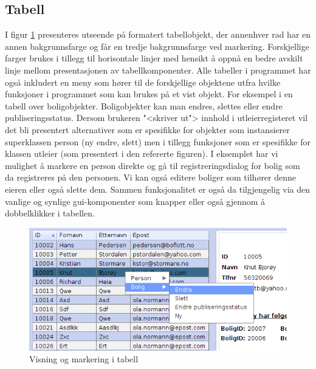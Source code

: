 \subsection{Tabell}
I figur \ref{fig:tabell} presenteres utseende på formatert tabellobjekt, der annenhver rad har en annen bakgrunnsfarge og får en tredje bakgrunnsfarge ved markering. Forskjellige farger brukes i tillegg til horisontale linjer med hensikt å oppnå en bedre avskilt linje mellom presentasjonen av tabellkomponenter. Alle tabeller i programmet har også inkludert en meny som hører til de forskjellige objektene utfra hvilke funksjoner i programmet som kan brukes på et vist objekt. For eksempel i en tabell over boligobjekter. Boligobjekter kan man endres, slettes eller endre publiseringsstatus. Dersom brukeren "<skriver ut"> innhold i utleierregisteret vil det bli presentert alternativer som er spesifikke for objekter som instansierer superklassen person (ny endre, slett) men i tillegg funksjoner som er spesifikke for klassen utleier (som presentert i den refererte figuren). I eksemplet har vi mulighet å markere en person direkte og gå til registreringsdialog for bolig som da registreres på den personen. Vi kan også editere boliger som tilhører denne eieren eller også slette dem. Sammen funksjonalitet er også da tilgjengelig via den vanlige og synlige gui-komponenter som knapper eller også gjennom å dobbelklikker i tabellen.

\begin{figure}[ht!]
\center
 \includegraphics[scale=0.7]{./img/produktdokumentasjon/visuelle_detaljer/tabell.png}
 \caption{Visning og markering i tabell}
 \label{fig:tabell}
\end{figure}

